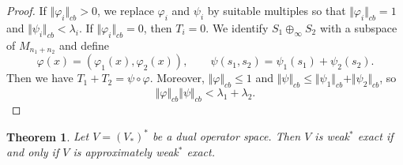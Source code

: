 \documentclass[12pt]{article}
\newtheorem{theorem}{Theorem}[section]
\theoremstyle{definition}
\theoremstyle{remark}
\begin{document}
\begin{proof}
If $\Vert\varphi_i\Vert_{cb}>0$, we replace $\varphi_i$ and $\psi_i$ by
suitable multiples so that $\Vert\varphi_i\Vert_{cb}=1$ and
$\Vert\psi_i\Vert_{cb}<\lambda_i$. If $\Vert\varphi_i\Vert_{cb}=0$, then
$T_i=0$. We identify $S_1\oplus_\infty S_2$ with a
subspace of $M_{n_1+n_2}$ and define
\[
\varphi(x)=(\varphi_1(x),\varphi_2(x)),
\qquad
\psi(s_1,s_2)=\psi_1(s_1)+\psi_2(s_2).
\]
Then we have $T_1+T_2=\psi\circ\varphi$. Moreover,
$\Vert\varphi\Vert_{cb}\le 1$ and
$\Vert\psi\Vert_{cb}\le\Vert\psi_1\Vert_{cb}+\Vert\psi_2\Vert_{cb}$, so
\[
\Vert\varphi\Vert_{cb}\Vert\psi\Vert_{cb}
<\lambda_1+\lambda_2.
\]
\end{proof}

\begin{theorem}\label{thm:weak-star}
Let $V=(V_*)^*$ be a dual operator space. Then $V$ is weak$^{*}$ exact
if and only if $V$ is approximately weak$^{*}$ exact.
\end{theorem}
\end{document}
